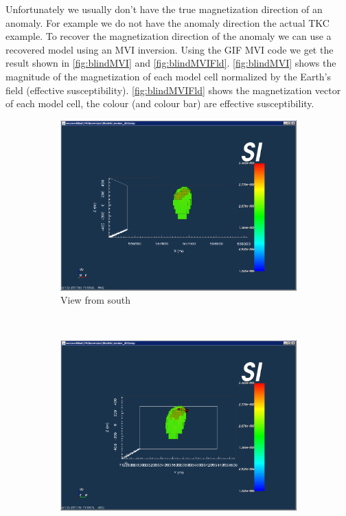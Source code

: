 Unfortunately we usually don't have the true magnetization direction of an anomaly. For example we do not have the anomaly direction the actual TKC example. To recover the magnetization direction of the anomaly we can use a recovered model using an \ac{MVI} inversion. Using the \ac{GIF} \ac{MVI} code we get the result shown in \autoref{fig:blindMVI} and \autoref{fig:blindMVIFld}. \autoref{fig:blindMVI} shows the magnitude of the magnetization of each model cell normalized by the Earth's field (effective susceptibility). \autoref{fig:blindMVIFld} shows the magnetization vector of each model cell, the colour (and colour bar) are effective susceptibility. 

\begin{figure}
    \centering
    \begin{subfigure}[b]{0.5\textwidth}
        \includegraphics[width=\textwidth]{images/TKC/blindMVIsouth.PNG}
        \caption{View from south}
        \label{fig:blindMVIsouth}
    \end{subfigure}
    ~ %
    \begin{subfigure}[b]{0.5\textwidth}
        \includegraphics[width=\textwidth]{images/TKC/blindMVIeast.PNG}

\end{subfigure}
\end{figure}

